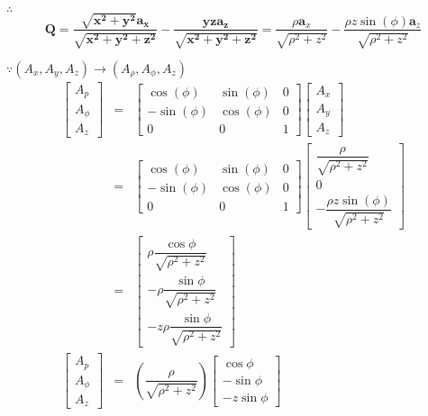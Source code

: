 \documentclass{article}
\begin{document}
$\therefore $%
\[
\mathbf{Q=\dfrac{\sqrt{x^{2}+y^{2}}\mathbf{a}_{x}}{\sqrt{x^{2}+y^{2}+z^{2}}}-%
\dfrac{yz\mathbf{a}_{z}}{\sqrt{x^{2}+y^{2}+z^{2}}}=}\dfrac{\rho \mathbf{a}%
_{x}}{\sqrt{\rho ^{2}+z^{2}}}-\dfrac{\rho z\sin \left( \phi \right) \mathbf{a%
}_{z}}{\sqrt{\rho ^{2}+z^{2}}} 
\]

$\because \left( A_{x},A_{y},A_{z}\right) \longrightarrow \left( A_{\rho
},A_{\phi },A_{z}\right) $ 
\begin{eqnarray*}
\left[ 
\begin{array}{c}
A_{p} \\ 
A_{\phi } \\ 
A_{z}%
\end{array}%
\right] &=&\left[ 
\begin{array}{ccc}
\cos \left( \phi \right) & \sin \left( \phi \right) & 0 \\ 
-\sin \left( \phi \right) & \cos \left( \phi \right) & 0 \\ 
0 & 0 & 1%
\end{array}%
\right] \left[ 
\begin{array}{c}
A_{x} \\ 
A_{y} \\ 
A_{z}%
\end{array}%
\right] \\
&=&\left[ 
\begin{array}{ccc}
\cos \left( \phi \right) & \sin \left( \phi \right) & 0 \\ 
-\sin \left( \phi \right) & \cos \left( \phi \right) & 0 \\ 
0 & 0 & 1%
\end{array}%
\right] \left[ 
\begin{array}{c}
\dfrac{\rho }{\sqrt{\rho ^{2}+z^{2}}} \\ 
0 \\ 
-\dfrac{\rho z\sin \left( \phi \right) }{\sqrt{\rho ^{2}+z^{2}}}%
\end{array}%
\right] \\
&=&\left[ 
\begin{array}{c}
\rho \dfrac{\cos \phi }{\sqrt{\rho ^{2}+z^{2}}} \\ 
-\rho \dfrac{\sin \phi }{\sqrt{\rho ^{2}+z^{2}}} \\ 
-z\rho \dfrac{\sin \phi }{\sqrt{\rho ^{2}+z^{2}}}%
\end{array}%
\right] \allowbreak \\
\left[ 
\begin{array}{c}
A_{p} \\ 
A_{\phi } \\ 
A_{z}%
\end{array}%
\right] &=&\left( \dfrac{\rho }{\sqrt{\rho ^{2}+z^{2}}}\right) \left[ 
\begin{array}{c}
\cos \phi \\ 
-\sin \phi \\ 
-z\sin \phi%
\end{array}%
\right] \allowbreak
\end{eqnarray*}
\end{document}
